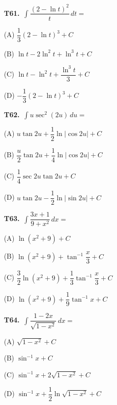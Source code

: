 \documentclass[11pt]{article}
\begin{document}
\bigskip\noindent\textbf{T61.}\ $\displaystyle\int \dfrac{(2-\ln t)^2}{t}\,dt =$
\begin{list}{}{\setlength{\leftmargin}{3em}\setlength{\labelwidth}{2.5em}\setlength{\itemsep}{0pt}\setlength{\topsep}{2pt}}
\item[(A)] $\dfrac{1}{3}(2-\ln t)^3+C$
\item[(B)] $\ln t-2\ln^2t+\ln^3t+C$
\item[(C)] $\ln t-\ln^2t+\dfrac{\ln^3t}{3}+C$
\item[(D)] $-\dfrac{1}{3}(2-\ln t)^3+C$
\end{list}

\bigskip\noindent\textbf{T62.}\ $\displaystyle\int u\sec^2(2u)\,du =$
\begin{list}{}{\setlength{\leftmargin}{3em}\setlength{\labelwidth}{2.5em}\setlength{\itemsep}{0pt}\setlength{\topsep}{2pt}}
\item[(A)] $u\tan 2u+\dfrac{1}{2}\ln|\cos 2u|+C$
\item[(B)] $\dfrac{u}{2}\tan 2u+\dfrac{1}{4}\ln|\cos 2u|+C$
\item[(C)] $\dfrac{1}{4}\sec 2u\tan 2u+C$
\item[(D)] $u\tan 2u-\dfrac{1}{2}\ln|\sin 2u|+C$
\end{list}

\bigskip\noindent\textbf{T63.}\ $\displaystyle\int \dfrac{3x+1}{9+x^2}\,dx =$
\begin{list}{}{\setlength{\leftmargin}{3em}\setlength{\labelwidth}{2.5em}\setlength{\itemsep}{0pt}\setlength{\topsep}{2pt}}
\item[(A)] $\ln(x^2+9)+C$
\item[(B)] $\ln(x^2+9)+\tan^{-1}\dfrac{x}{3}+C$
\item[(C)] $\dfrac{3}{2}\ln(x^2+9)+\dfrac{1}{3}\tan^{-1}\dfrac{x}{3}+C$
\item[(D)] $\ln(x^2+9)+\dfrac{1}{9}\tan^{-1}x+C$
\end{list}

\bigskip\noindent\textbf{T64.}\ $\displaystyle\int \dfrac{1-2x}{\sqrt{1-x^2}}\,dx =$
\begin{list}{}{\setlength{\leftmargin}{3em}\setlength{\labelwidth}{2.5em}\setlength{\itemsep}{0pt}\setlength{\topsep}{2pt}}
\item[(A)] $\sqrt{1-x^2}+C$
\item[(B)] $\sin^{-1}x+C$
\item[(C)] $\sin^{-1}x+2\sqrt{1-x^2}+C$
\item[(D)] $\sin^{-1}x+\dfrac{1}{2}\ln\sqrt{1-x^2}+C$
\end{list}
\end{document}
